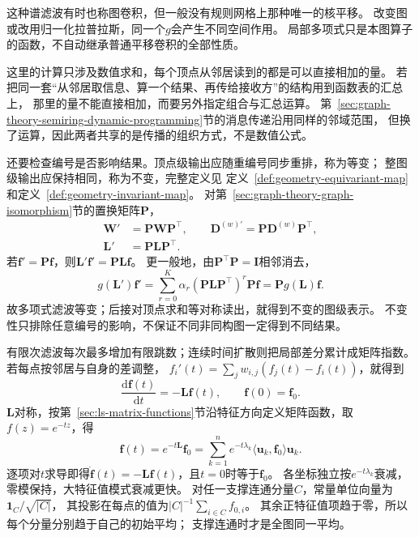 这种谱滤波有时也称图卷积，但一般没有规则网格上那种唯一的核平移。
改变图或改用归一化拉普拉斯，同一个\(g\)会产生不同空间作用。
局部多项式只是本图算子的函数，不自动继承普通平移卷积的全部性质。

这里的计算只涉及数值求和，每个顶点从邻居读到的都是可以直接相加的量。
若把同一套“从邻居取信息、算一个结果、再传给接收方”的结构用到函数表的汇总上，
那里的量不能直接相加，而要另外指定组合与汇总运算。
第~\ref{sec:graph-theory-semiring-dynamic-programming}节的消息传递沿用同样的邻域范围，
但换了运算，因此两者共享的是传播的组织方式，不是数值公式。

还要检查编号是否影响结果。顶点级输出应随重编号同步重排，称为等变；
整图级输出应保持相同，称为不变，完整定义见
定义~\ref{def:geometry-equivariant-map}和定义~\ref{def:geometry-invariant-map}。
对第~\ref{sec:graph-theory-graph-isomorphism}节的置换矩阵\(\bm P\)，
\begin{equation}
  \begin{aligned}
    \bm W'&=\bm P\bm W\bm P^\top,\qquad
    \bm D^{(w)\prime}=\bm P\bm D^{(w)}\bm P^\top,\\
    \bm L'&=\bm P\bm L\bm P^\top.
  \end{aligned}
  \label{eq:graph-theory-laplacian-relabel}
\end{equation}
若\(\bm f'=\bm P\bm f\)，则\(\bm L'\bm f'=\bm P\bm L\bm f\)。
更一般地，由\(\bm P^\top\bm P=\bm I\)相邻消去，
\[
  g(\bm L')\bm f'
  =\sum_{r=0}^K\alpha_r(\bm P\bm L\bm P^\top)^r\bm P\bm f
  =\bm P g(\bm L)\bm f.
\]
故多项式滤波等变；后接对顶点求和等对称读出，就得到不变的图级表示。
不变性只排除任意编号的影响，不保证不同非同构图一定得到不同结果。

有限次滤波每次最多增加有限跳数；连续时间扩散则把局部差分累计成矩阵指数。
若每点按邻居与自身的差调整，
\(f_i'(t)=\sum_jw_{i,j}(f_j(t)-f_i(t))\)，就得到
\begin{equation}
  \frac{\mathrm d\bm f(t)}{\mathrm dt}=-\bm L\bm f(t),\qquad
  \bm f(0)=\bm f_0.
  \label{eq:graph-theory-heat-equation}
\end{equation}
\(\bm L\)对称，按第~\ref{sec:ls-matrix-functions}节沿特征方向定义矩阵函数，取\(f(z)=e^{-tz}\)，得
\[
  \bm f(t)=e^{-t\bm L}\bm f_0
  =\sum_{k=1}^ne^{-t\lambda_k}
    \langle\bm u_k,\bm f_0\rangle\bm u_k.
\]
逐项对\(t\)求导即得\(\dot{\bm f}(t)=-\bm L\bm f(t)\)，且\(t=0\)时等于\(\bm f_0\)。
各坐标独立按\(e^{-t\lambda_k}\)衰减，零模保持，大特征值模式衰减更快。
对任一支撑连通分量\(C\)，常量单位向量为\(\bm1_C/\sqrt{|C|}\)，
其投影在每点的值为\(|C|^{-1}\sum_{i\in C}f_{0,i}\)。
其余正特征值项趋于零，所以每个分量分别趋于自己的初始平均；
支撑连通时才是全图同一平均。

